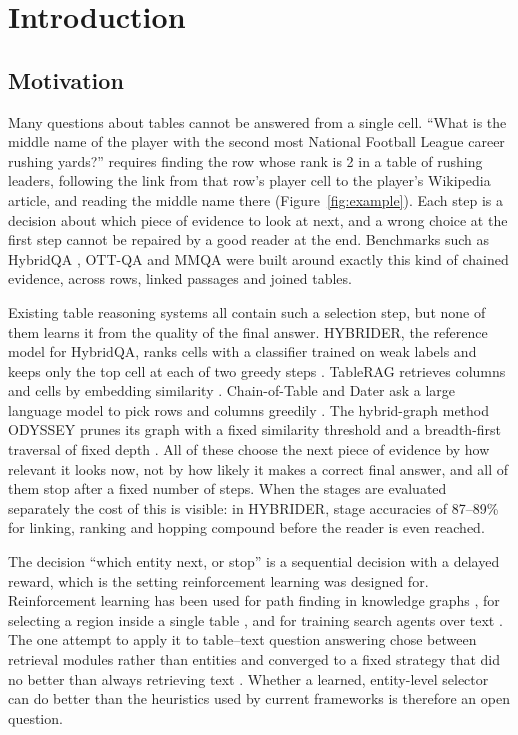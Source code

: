 \chapter{Introduction}
\label{ch:intro}

\section{Motivation}

Many questions about tables cannot be answered from a single cell. ``What is the middle name of the player with the second most National Football League career rushing yards?'' requires finding the row whose rank is 2 in a table of rushing leaders, following the link from that row's player cell to the player's Wikipedia article, and reading the middle name there (Figure~\ref{fig:example}). Each step is a decision about which piece of evidence to look at next, and a wrong choice at the first step cannot be repaired by a good reader at the end. Benchmarks such as HybridQA \citep{chen-etal-2020-hybridqa}, OTT-QA \citep{chen2021open} and MMQA \citep{wu2025mmqa} were built around exactly this kind of chained evidence, across rows, linked passages and joined tables.

Existing table reasoning systems all contain such a selection step, but none of them learns it from the quality of the final answer. HYBRIDER, the reference model for HybridQA, ranks cells with a classifier trained on weak labels and keeps only the top cell at each of two greedy steps \citep{chen-etal-2020-hybridqa}. TableRAG retrieves columns and cells by embedding similarity \citep{chen2024tablerag}. Chain-of-Table and Dater ask a large language model to pick rows and columns greedily \citep{wang2024chainoftable,ye2023dater}. The hybrid-graph method ODYSSEY prunes its graph with a fixed similarity threshold and a breadth-first traversal of fixed depth \citep{agarwal-etal-2025-hybrid}. All of these choose the next piece of evidence by how relevant it looks now, not by how likely it makes a correct final answer, and all of them stop after a fixed number of steps. When the stages are evaluated separately the cost of this is visible: in HYBRIDER, stage accuracies of 87--89\% for linking, ranking and hopping compound before the reader is even reached.

The decision ``which entity next, or stop'' is a sequential decision with a delayed reward, which is the setting reinforcement learning was designed for. Reinforcement learning has been used for path finding in knowledge graphs \citep{xiong2017deeppath,das2018minerva,lin2018multihop}, for selecting a region inside a single table \citep{lee2024learningtoreduce,wu2025tabler1region}, and for training search agents over text \citep{jin2025searchr1,jiang2025s3,wang2025stepsearch}. The one attempt to apply it to table--text question answering chose between retrieval modules rather than entities and converged to a fixed strategy that did no better than always retrieving text \citep{jose2024qatexttablesdrl}. Whether a learned, entity-level selector can do better than the heuristics used by current frameworks is therefore an open question.

